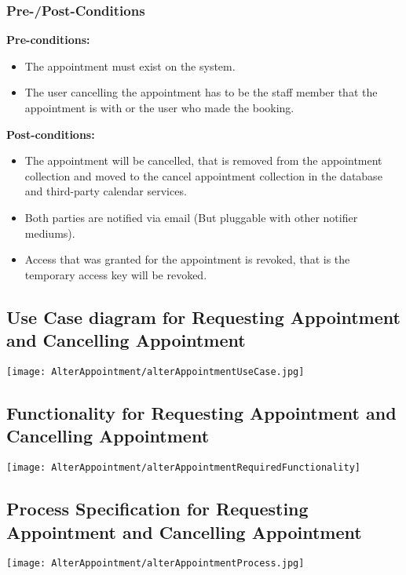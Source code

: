 \subsubsection{Pre-/Post-Conditions}
\textbf{Pre-conditions:} 
	\begin{itemize}
		\item The appointment must exist on the system.
		\item The user cancelling the appointment has to be the staff member that the appointment is with or the user who made the booking.
	\end{itemize}
\textbf{Post-conditions:} 
	\begin{itemize}
		\item The appointment will be cancelled, that is removed from the appointment collection and moved to the cancel appointment collection in the database and third-party calendar services.
		\item  Both parties are notified via email (But pluggable with other notifier mediums).
		\item Access that was granted for the appointment is revoked, that is the temporary access key will be revoked. 
	\end{itemize}

\subsection{Use Case diagram for Requesting Appointment and Cancelling Appointment}
	\texttt{[image: AlterAppointment/alterAppointmentUseCase.jpg]}
	
\subsection{Functionality for Requesting Appointment and Cancelling Appointment}
	\texttt{[image: AlterAppointment/alterAppointmentRequiredFunctionality]}
	
\subsection{Process Specification for Requesting Appointment and Cancelling Appointment}
	\texttt{[image: AlterAppointment/alterAppointmentProcess.jpg]}


